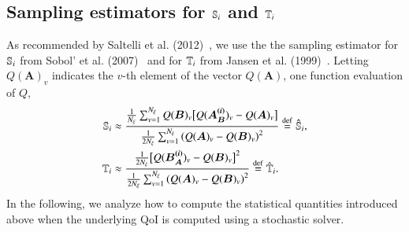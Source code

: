 \subsection{Sampling estimators for \texorpdfstring{$\S{i}$}{Si} and \texorpdfstring{$\T{i}$}{Ti}} \label{subsec:saltelli-est}
As recommended by Saltelli et al. (2012)~\cite{saltelli-etal-2012}, we use the 
the sampling estimator for $\S{i}$ from Sobol' et al. (2007)~\cite{sobol-etal-2007} and for $\T{i}$ from Jansen et al. (1999)~\cite{jansen-1999}. 
Letting $Q(\bm{A})_v$ indicates the $v$-th element of the vector $Q(\bm{A})$, \ie one function evaluation of $Q$, 
\begin{align} \label{m2eq:saltelli-si}
    \S{i} &\approx \frac{\frac{1}{\Nxi} \sumv Q(\bm{B})_v \bigl[ Q(\bm{A_B^{(i)}})_v - Q(\bm{A})_v \bigr]}{\frac{1}{2\Nxi} \sumv \left( Q(\bm{A})_v - Q(\bm{B})_v \right)^2} \defin \Ssalt{i}, \\ \label{m2eq:saltelli-ti}
    \T{i} &\approx \frac{ \frac{1}{2\Nxi} \bigl[ Q(\bm{B_A^{(i)}})_v - Q(\bm{B})_v \bigr]^2}{\frac{1}{2\Nxi} \sumv \left( Q(\bm{A})_v - Q(\bm{B})_v \right)^2} \defin \Tsalt{i} .
\end{align}
In the following, we analyze how to compute the statistical quantities introduced above when the underlying QoI is computed using a stochastic solver.
